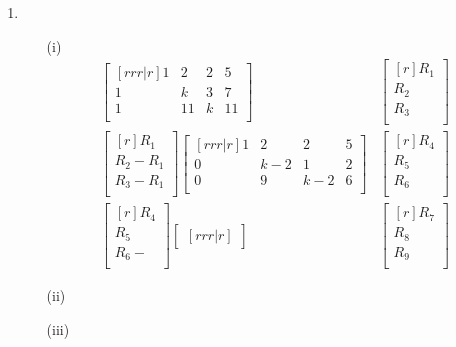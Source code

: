 \documentclass{report}
\begin{document}
\begin{enumerate}
\begin{enumerate}
\begin{enumerate}
		\end{enumerate}	
		\medskip
	\item
	\medskip
		\begin{enumerate}
		\item [(i)]
		\begin{align*}
		\begin{bmatrix}[rrr|r]
		1 & 2 & 2 & 5\\
		1 & k & 3 & 7\\
		1 & 11 & k & 11\\
		\end{bmatrix}&
		\begin{bmatrix}[r]
		R_1\\ R_2\\ R_3\\
		\end{bmatrix}\\
		\begin{bmatrix}[r]
		R_1\\
		R_2 - R_1\\
		R_3 - R_1\\
		\end{bmatrix}
		\begin{bmatrix}[rrr|r]
		1 & 2 & 2 & 5\\
		0 & k-2 & 1 & 2\\
		0 & 9 & k-2 & 6\\
		\end{bmatrix}&
		\begin{bmatrix}[r]
		R_4\\ R_5\\ R_6\\
		\end{bmatrix}\\
		\begin{bmatrix}[r]
		R_4\\
		R_5\\
		R_6 - \\
		\end{bmatrix}
		\begin{bmatrix}[rrr|r]
		\end{bmatrix}&
		\begin{bmatrix}[r]
		R_7\\ R_8\\ R_9\\
		\end{bmatrix}
		\end{align*}
		\item [(ii)]
		\item [(iii)]
		\end{enumerate}
	\end{enumerate}
\medskip

\end{enumerate}
\end{document}
